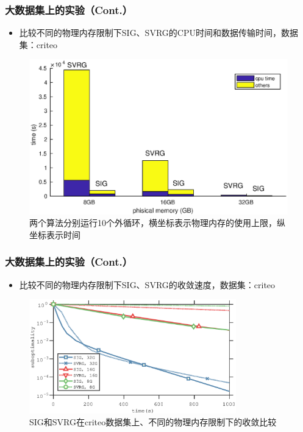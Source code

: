   \frame
  {
    \frametitle{大数据集上的实验（Cont.）}
    \footnotesize
    \begin{itemize}
        \item 比较不同的物理内存限制下SIG、SVRG的CPU时间和数据传输时间，数据集：criteo
    \end{itemize}

    \vspace*{-0.5cm}
    \begin{figure}
        \includegraphics[trim={0 0 0 0},clip,width=11.5cm]{data/img/bar_time}
        \caption{两个算法分别运行10个外循环，横坐标表示物理内存的使用上限，纵坐标表示时间}
    \end{figure}

  }

  \frame
  {
    \frametitle{大数据集上的实验（Cont.）}
    \footnotesize
    \begin{itemize}
        \item 比较不同的物理内存限制下SIG、SVRG的收敛速度，数据集：criteo
    \end{itemize}

    \vspace*{-0.5cm}
    \begin{figure}
        \includegraphics[trim={0cm 0 0 0cm},clip,width=0.8\textwidth]{data/img/figure6}
        \caption{SIG和SVRG在criteo数据集上、不同的物理内存限制下的收敛比较}
    \end{figure}

  }
